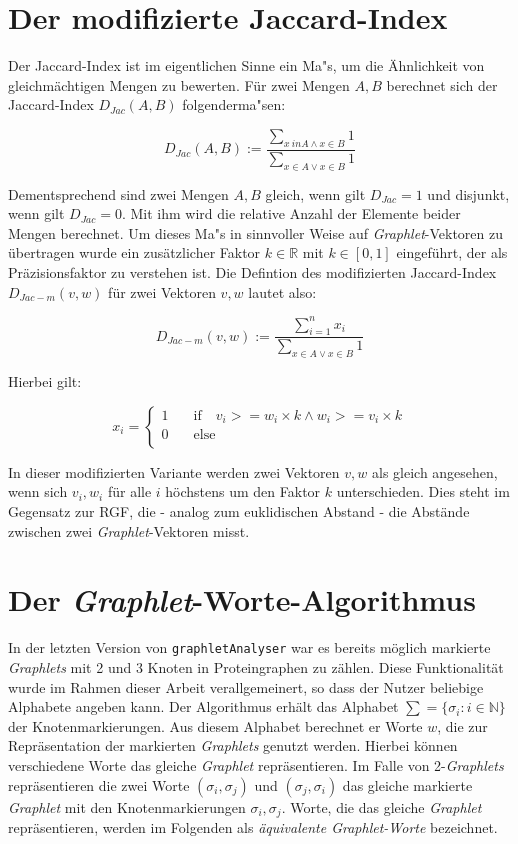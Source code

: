 \documentclass{report}
\begin{document}
\section{Der modifizierte Jaccard-Index}


Der Jaccard-Index ist im eigentlichen Sinne ein Ma"s, um die \"Ahnlichkeit von gleichm\"achtigen Mengen zu bewerten. F\"ur zwei Mengen $A,B$ berechnet sich der Jaccard-Index $D_{Jac}(A,B)$ folgenderma"sen:

\[ D_{Jac}(A,B) := \frac{\sum_{x \ in A \land x \in B} 1}{\sum_{x \in A \lor x \in B} 1} \]

Dementsprechend sind zwei Mengen $A,B$ gleich, wenn  gilt $D_{Jac} = 1$ und disjunkt, wenn gilt $D_{Jac} = 0$. Mit ihm wird die relative Anzahl der Elemente beider Mengen berechnet.
Um dieses Ma"s in sinnvoller Weise auf \textit{Graphlet}-Vektoren zu \"ubertragen wurde ein zus\"atzlicher Faktor $k \in \mathbb{R} $ mit $k \in [0,1]$  eingef\"uhrt, der als Pr\"azisionsfaktor zu verstehen ist. Die Defintion des modifizierten Jaccard-Index $D_{Jac-m}(v,w)$ f\"ur zwei Vektoren $v,w$ lautet also:

\[ D_{Jac-m}(v,w) := \frac{\sum_{i = 1}^n x_i}{\sum_{x \in A \lor x \in B} 1} \]

Hierbei gilt:

\[ x_i = 
   \begin{cases}
     1     & \quad \mathrm{if} \quad v_i >= w_i \times k \land w_i >= v_i \times k \\
     0     & \quad \mathrm{else} \\
   \end{cases}
\]

In dieser modifizierten Variante werden zwei Vektoren $v,w$ als gleich angesehen, wenn sich $v_i,w_i$ f\"ur alle $i$ h\"ochstens um den Faktor $k$ unterschieden.
Dies steht im Gegensatz zur RGF, die - analog zum euklidischen Abstand - die Abst\"ande zwischen zwei \textit{Graphlet}-Vektoren misst.


\section{Der \textit{Graphlet}-Worte-Algorithmus}

In der letzten Version von \texttt{graphletAnalyser} war es bereits m\"oglich markierte \textit{Graphlets} mit 2 und 3 Knoten in Proteingraphen zu z\"ahlen. Diese Funktionalit\"at wurde im Rahmen dieser Arbeit verallgemeinert, so dass der Nutzer beliebige Alphabete angeben kann.
Der Algorithmus erh\"alt das Alphabet $\sum = \{ \sigma_i : i \in \mathbb{N} \}$ der Knotenmarkierungen. Aus diesem Alphabet berechnet er Worte $w$, die zur Repr\"asentation der markierten \textit{Graphlets} genutzt werden.
Hierbei k\"onnen verschiedene Worte das gleiche \textit{Graphlet} repr\"asentieren. Im Falle von 2-\textit{Graphlets} repr\"asentieren die zwei Worte $(\sigma_i,\sigma_j)$ und $(\sigma_j, \sigma_i)$ das gleiche markierte \textit{Graphlet} mit den Knotenmarkierungen $\sigma_i,\sigma_j$. Worte, die das gleiche \textit{Graphlet} repr\"asentieren, werden im Folgenden als \emph{\"aquivalente Graphlet-Worte}  bezeichnet.
\end{document}

